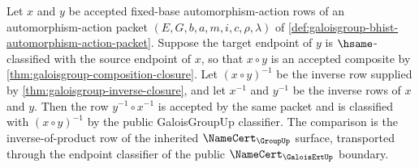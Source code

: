 \begin{theorem}
\label{thm:galoisgroup-inverse-of-composition-row}
Let $x$ and $y$ be accepted fixed-base automorphism-action rows of an
automorphism-action packet
$(E,G,b,a,m,i,c,\rho,\lambda)$ of
\autoref{def:galoisgroup-bhist-automorphism-action-packet}. Suppose the target
endpoint of $y$ is $\hsame$-classified with the source endpoint of $x$, so that
$ x\circ y $ is an accepted composite by
\autoref{thm:galoisgroup-composition-closure}. Let $(x\circ y)^{-1}$ be the
inverse row supplied by \autoref{thm:galoisgroup-inverse-closure}, and let
$x^{-1}$ and $y^{-1}$ be the inverse rows of $x$ and $y$. Then the row
$y^{-1}\circ x^{-1}$ is accepted by the same packet and is classified with
$(x\circ y)^{-1}$ by the public GaloisGroupUp classifier. The comparison is the
inverse-of-product row of the inherited $\NameCert_{\GroupUp}$ surface,
transported through the endpoint classifier of the public
$\NameCert_{\GaloisExtUp}$ boundary.
\end{theorem}
